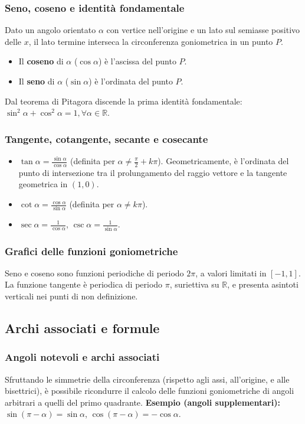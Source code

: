 \subsubsection{Seno, coseno e identità fondamentale}
Dato un angolo orientato $\alpha$ con vertice nell'origine e un lato sul semiasse positivo delle $x$, il lato termine interseca la circonferenza goniometrica in un punto $P$. 
\begin{itemize}
    \item Il \textbf{coseno} di $\alpha$ ($\cos \alpha$) è l'ascissa del punto $P$.
    \item Il \textbf{seno} di $\alpha$ ($\sin \alpha$) è l'ordinata del punto $P$.
\end{itemize}
Dal teorema di Pitagora discende la prima identità fondamentale: $\sin^2 \alpha + \cos^2 \alpha = 1, \forall \alpha \in \mathbb{R}$.

\subsubsection{Tangente, cotangente, secante e cosecante}
\begin{itemize}
    \item $\tan \alpha = \frac{\sin \alpha}{\cos \alpha}$ (definita per $\alpha \neq \frac{\pi}{2} + k\pi$). Geometricamente, è l'ordinata del punto di intersezione tra il prolungamento del raggio vettore e la tangente geometrica in $(1,0)$.
    \item $\cot \alpha = \frac{\cos \alpha}{\sin \alpha}$ (definita per $\alpha \neq k\pi$).
    \item $\sec \alpha = \frac{1}{\cos \alpha}$, $\csc \alpha = \frac{1}{\sin \alpha}$.
\end{itemize}

\subsubsection{Grafici delle funzioni goniometriche}
Seno e coseno sono funzioni periodiche di periodo $2\pi$, a valori limitati in $[-1, 1]$. La funzione tangente è periodica di periodo $\pi$, suriettiva su $\mathbb{R}$, e presenta asintoti verticali nei punti di non definizione.

\subsection{Archi associati e formule}
\subsubsection{Angoli notevoli e archi associati}
Sfruttando le simmetrie della circonferenza (rispetto agli assi, all'origine, e alle bisettrici), è possibile ricondurre il calcolo delle funzioni goniometriche di angoli arbitrari a quelli del primo quadrante. 
\textbf{Esempio (angoli supplementari):} $\sin(\pi - \alpha) = \sin \alpha$, $\cos(\pi - \alpha) = -\cos \alpha$.

